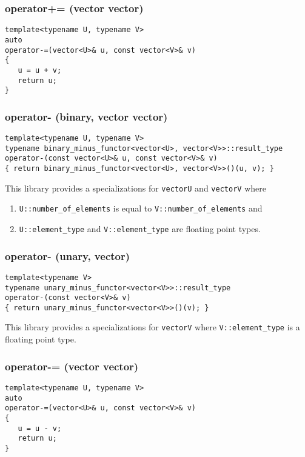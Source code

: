 \documentclass[oneside]{book}
\begin{document}
\subsubsection{operator+= (vector vector)}
\begin{verbatim}
template<typename U, typename V>
auto
operator-=(vector<U>& u, const vector<V>& v)
{
   u = u + v;
   return u;
}
\end{verbatim}
\subsubsection{operator- (binary, vector vector)}
\begin{verbatim}
template<typename U, typename V>
typename binary_minus_functor<vector<U>, vector<V>>::result_type
operator-(const vector<U>& u, const vector<V>& v)
{ return binary_minus_functor<vector<U>, vector<V>>()(u, v); }
\end{verbatim}
This library provides a specializations for \texttt{vector\textlangle U\textrangle}
and \texttt{vector\textlangle V\textrangle} where
\begin{enumerate}
	\item \texttt{U::number\_of\_elements} is equal to \texttt{V::number\_of\_elements} and
	\item \texttt{U::element\_type} and \texttt{V::element\_type} are floating point types.
\end{enumerate}

\subsubsection{operator- (unary, vector)}
\begin{verbatim}
template<typename V>
typename unary_minus_functor<vector<V>>::result_type
operator-(const vector<V>& v)
{ return unary_minus_functor<vector<V>>()(v); }
\end{verbatim}
This library provides a specializations for \texttt{vector\textlangle V\textrangle}
where \texttt{V::element\_type} is a floating point type.

\subsubsection{operator-= (vector vector)}
\begin{verbatim}
template<typename U, typename V>
auto
operator-=(vector<U>& u, const vector<V>& v)
{
   u = u - v;
   return u;
}
\end{verbatim}
\end{document}
